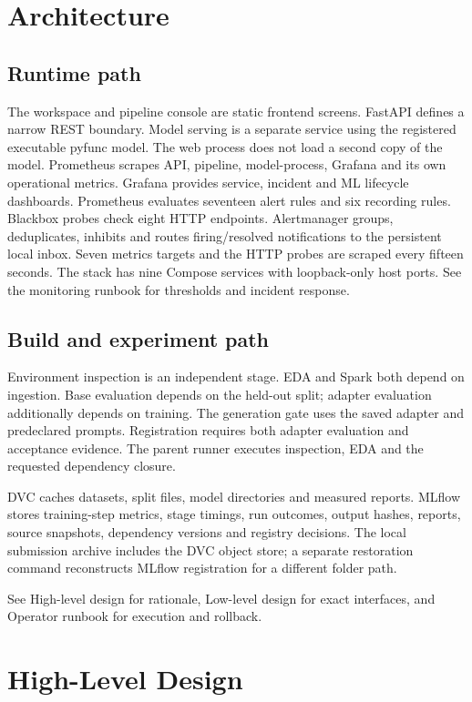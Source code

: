 \documentclass[11pt,a4paper]{article}
\begin{document}
\section*{Architecture}
\subsection*{Runtime path}
The workspace and pipeline console are static frontend screens. FastAPI defines a narrow REST boundary. Model serving is a separate service using the registered executable pyfunc model. The web process does not load a second copy of the model. Prometheus scrapes API, pipeline, model-process, Grafana and its own operational metrics. Grafana provides service, incident and ML lifecycle dashboards. Prometheus evaluates seventeen alert rules and six recording rules. Blackbox probes check eight HTTP endpoints. Alertmanager groups, deduplicates, inhibits and routes firing/resolved notifications to the persistent local inbox. Seven metrics targets and the HTTP probes are scraped every fifteen seconds. The stack has nine Compose services with loopback-only host ports. See the monitoring runbook for thresholds and incident response.

\subsection*{Build and experiment path}
Environment inspection is an independent stage. EDA and Spark both depend on ingestion. Base evaluation depends on the held-out split; adapter evaluation additionally depends on training. The generation gate uses the saved adapter and predeclared prompts. Registration requires both adapter evaluation and acceptance evidence. The parent runner executes inspection, EDA and the requested dependency closure.

DVC caches datasets, split files, model directories and measured reports. MLflow stores training-step metrics, stage timings, run outcomes, output hashes, reports, source snapshots, dependency versions and registry decisions. The local submission archive includes the DVC object store; a separate restoration command reconstructs MLflow registration for a different folder path.

See High-level design for rationale, Low-level design for exact interfaces, and Operator runbook for execution and rollback.

\clearpage
\section*{High-Level Design}
\end{document}
